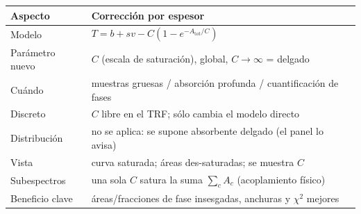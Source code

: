 \begin{center}
\begin{tabular}{@{}ll@{}}
\toprule
\textbf{Aspecto} & \textbf{Corrección por espesor}\\
\midrule
Modelo & $T=b+s v - C(1-e^{-A_{\text{tot}}/C})$ \\
Parámetro nuevo & $C$ (escala de saturación), global, $C\to\infty$ = delgado\\
Cuándo & muestras gruesas / absorción profunda / cuantificación de fases\\
Discreto & $C$ libre en el TRF; sólo cambia el modelo directo\\
Distribución & no se aplica: se supone absorbente delgado (el panel lo avisa)\\
Vista & curva saturada; áreas des-saturadas; se muestra $C$\\
Subespectros & una sola $C$ satura la suma $\sum_c A_c$ (acoplamiento físico)\\
Beneficio clave & áreas/fracciones de fase insesgadas, anchuras y $\chi^2$ mejores\\
\bottomrule
\end{tabular}
\end{center}
